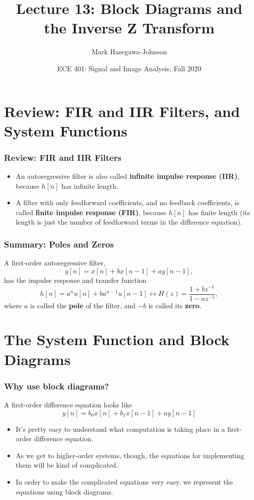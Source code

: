 \documentclass{beamer}
\title{Lecture 13: Block Diagrams and the Inverse Z Transform}
\author{Mark Hasegawa-Johnson}
\date{ECE 401: Signal and Image Analysis, Fall 2020}
\begin{document}
\begin{frame}
  \maketitle
\end{frame}

\begin{frame}
  \tableofcontents
\end{frame}

\section[Review]{Review: FIR and IIR Filters, and System Functions}
\setcounter{subsection}{1}

\begin{frame}
  \frametitle{Review: FIR and IIR Filters}
  \begin{itemize}
  \item An autoregressive filter is also called {\bf infinite impulse response (IIR)},
    because $h[n]$ has infinite length.
  \item A filter with only feedforward coefficients, and no feedback coefficients, is called
    {\bf finite impulse response (FIR)}, because $h[n]$ has finite length (its length is
    just the number of feedforward terms in the difference equation).
  \end{itemize}
\end{frame}
\begin{frame}
  \frametitle{Summary: Poles and Zeros}
  A first-order autoregressive filter,
  \[
  y[n] = x[n]+bx[n-1]+ay[n-1],
  \]
  has the impulse response and transfer function
  \[
  h[n]=a^n u[n]+ba^{n-1}u[n-1] \leftrightarrow H(z)  = \frac{1+bz^{-1}}{1-az^{-1}},
  \]
  where $a$ is called the {\bf pole} of the filter, and $-b$ is called
  its {\bf zero}.
\end{frame}

\section[Block Diagrams]{The System Function and Block Diagrams}
\setcounter{subsection}{1}

\begin{frame}
  \frametitle{Why use block diagrams?}

  A first-order difference equation looks like
  \[
  y[n] = b_0x[n]+b_1x[n-1] +ay[n-1]
  \]
  \begin{itemize}
  \item It's pretty easy to understand what computation is taking
    place in a first-order difference equation.
  \item As we get to higher-order systems, though, the equations for
    implementing them will be kind of complicated.
  \item In order to make the complicated equations very easy, we
    represent the equations using block diagrams.
  \end{itemize}
\end{frame}
\end{document}
